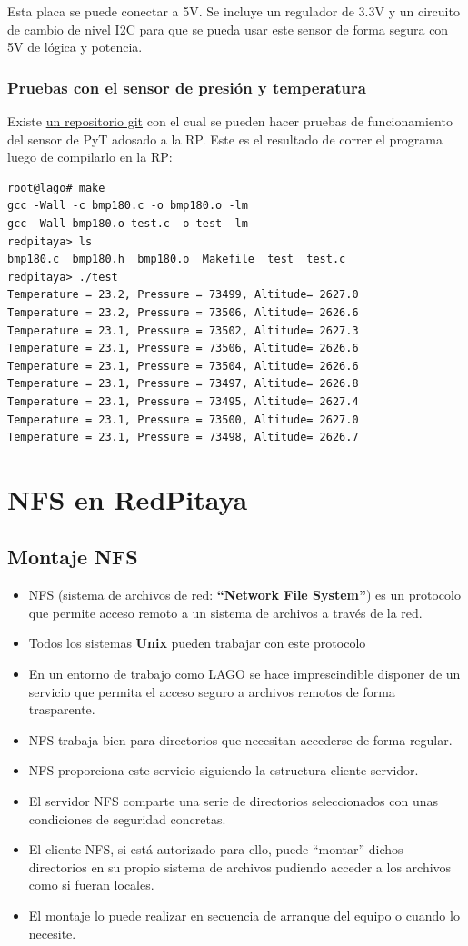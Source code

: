 \documentclass[a4paper,11pt]{article}
\begin{document}
Esta placa se puede conectar a 5V. Se incluye un regulador de 3.3V y un circuito de
cambio de nivel I2C para que se pueda usar este sensor de forma segura con 5V de
lógica y potencia.

\subsubsection{Pruebas con el sensor de presión y temperatura}
Existe \href{https://github.com/lagoprojectrp/rp\_bmp180}{un repositorio
git} con el cual se pueden hacer pruebas de funcionamiento del sensor de PyT
adosado a la RP. Este es el resultado de correr el programa luego de compilarlo
en la RP:
\begin{verbatim}
root@lago# make
gcc -Wall -c bmp180.c -o bmp180.o -lm
gcc -Wall bmp180.o test.c -o test -lm
redpitaya> ls
bmp180.c  bmp180.h  bmp180.o  Makefile  test  test.c
redpitaya> ./test
Temperature = 23.2, Pressure = 73499, Altitude= 2627.0
Temperature = 23.2, Pressure = 73506, Altitude= 2626.6
Temperature = 23.1, Pressure = 73502, Altitude= 2627.3
Temperature = 23.1, Pressure = 73506, Altitude= 2626.6
Temperature = 23.1, Pressure = 73504, Altitude= 2626.6
Temperature = 23.1, Pressure = 73497, Altitude= 2626.8
Temperature = 23.1, Pressure = 73495, Altitude= 2627.4
Temperature = 23.1, Pressure = 73500, Altitude= 2627.0
Temperature = 23.1, Pressure = 73498, Altitude= 2626.7
\end{verbatim}

\section{NFS en RedPitaya}
\subsection{Montaje NFS}
\begin{itemize}
  \item NFS (sistema de archivos de red: \textbf{``Network File System''}) es un
        protocolo que permite acceso remoto a un sistema de archivos a
        través de la red.
  \item Todos los sistemas \textbf{Unix} pueden trabajar con este protocolo
  \item En un entorno de trabajo como LAGO se hace imprescindible disponer de
        un servicio que permita el acceso seguro a archivos remotos de forma
        trasparente.
  \item NFS trabaja bien para directorios que necesitan accederse de
        forma regular.
  \item NFS proporciona este servicio siguiendo la estructura
        cliente-servidor.
  \item El servidor NFS comparte una serie de directorios
        seleccionados con unas condiciones de seguridad concretas.
  \item El cliente NFS, si está autorizado para ello, puede ``montar''
        dichos directorios en su propio sistema de archivos pudiendo acceder
        a los archivos como si fueran locales.
  \item El montaje lo puede realizar en secuencia de arranque del equipo o
        cuando lo necesite.
\end{itemize}
\end{document}
